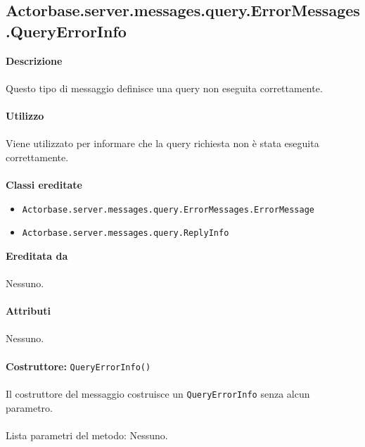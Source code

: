 \documentclass[a4paper]{article}
\begin{document}
	\subsection{Actorbase.server.messages.query.ErrorMessages.QueryErrorInfo}
		\textbf{Descrizione}
			\\ \\
			Questo tipo di messaggio definisce una query non eseguita correttamente.
			\\ \\
		\textbf{Utilizzo}
			\\ \\
			Viene utilizzato per informare che la query richiesta non è stata eseguita correttamente.
			\\ \\
		\textbf{Classi ereditate}
			\begin{itemize}
				\item \texttt{Actorbase.server.messages.query.ErrorMessages.ErrorMessage}
				\item \texttt{Actorbase.server.messages.query.ReplyInfo}
			\end{itemize}
		\textbf{Ereditata da}
			\\ \\
			Nessuno.
			\\ \\
		\textbf{Attributi}
			\\ \\
			Nessuno.
			\\ \\
		\textbf{Costruttore: } \texttt{QueryErrorInfo()}
			\\ \\
			Il costruttore del messaggio costruisce un \texttt{QueryErrorInfo} senza alcun parametro.
			\\ \\
			Lista parametri del metodo: Nessuno.
			
\end{document}
